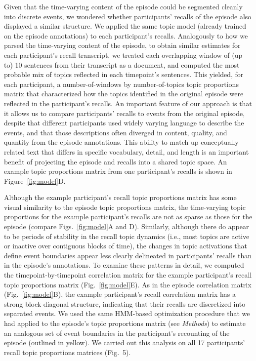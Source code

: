 \documentclass[10pt]{article}
\renewcommand{\includegraphics}[2][]{} %
\newcommand{\corrmats}{5} %
\providecommand{\DIFaddtex}[1]{{\protect\color{blue}\uwave{#1}}} %
\providecommand{\DIFaddbegin}{} %
\providecommand{\DIFaddend}{} %
\providecommand{\DIFadd}[1]{\texorpdfstring{\DIFaddtex{#1}}{#1}} %
\newcommand{\DIFaddincludegraphics}[2][]{{\color{blue}\fbox{\DIFOincludegraphics[#1]{#2}}}} %
\DeclareRobustCommand{\DIFaddbegin}{\DIFOaddbegin \let\includegraphics\DIFaddincludegraphics} %
\DeclareRobustCommand{\DIFaddend}{\DIFOaddend \let\includegraphics\DIFOincludegraphics} %
\begin{document}
Given that the time-varying content of the episode could be segmented cleanly into discrete events, we wondered whether participants' recalls of the episode also displayed a similar structure.  We applied the same topic model (already trained on the episode annotations) to each participant's recalls.  Analogously to how we parsed the time-varying content of the episode, to obtain similar estimates for each participant's recall transcript, we treated each overlapping  window of (up to) 10 sentences from their transcript as a document, and computed the most probable mix of topics reflected in each timepoint's sentences.  This yielded, for each participant, a number-of-windows by number-of-topics topic proportions matrix that characterized how the topics identified in the original episode were reflected in the participant's recalls.  An important feature of our approach is that it allows us to compare participants' recalls to events from the original episode, despite that different participants used widely varying language to describe the events, and that those descriptions often diverged in content, quality, and quantity from the episode annotations.  This ability to match up conceptually related text that differs in specific vocabulary, detail, and length is an important benefit of projecting the episode and recalls into a shared topic space.  An example topic proportions matrix from one participant's recalls is shown in Figure~\ref{fig:model}D.

Although the example participant's recall topic proportions matrix has some visual similarity to the episode topic proportions matrix, the time-varying topic proportions for the example participant's recalls are not as sparse as those for the episode (compare Figs.~\ref{fig:model}A and D).  Similarly, although there do appear to be periods of stability in the recall topic dynamics (i.e., most topics are active or inactive over contiguous blocks of time), the changes in topic activations that define event boundaries appear less clearly delineated in participants' recalls than in the episode's annotations.  To examine these patterns in detail, we computed the timepoint-by-timepoint correlation matrix for the example participant's recall topic proportions matrix (Fig.~\ref{fig:model}E).  As in the episode correlation matrix (Fig.~\ref{fig:model}B), the example participant's recall correlation matrix has a strong block diagonal structure, indicating that their recalls are discretized into separated events.  We used the same HMM-based optimization procedure that we had applied to the episode's topic proportions matrix (see \textit{Methods}) to estimate an analogous set of event boundaries in the participant's recounting of the episode (outlined in yellow).  We carried out this analysis on all 17 participants' recall topic proportions matrices (\DIFaddbegin \DIFadd{Supp.\ }\DIFaddend Fig.~\corrmats).
\end{document}
